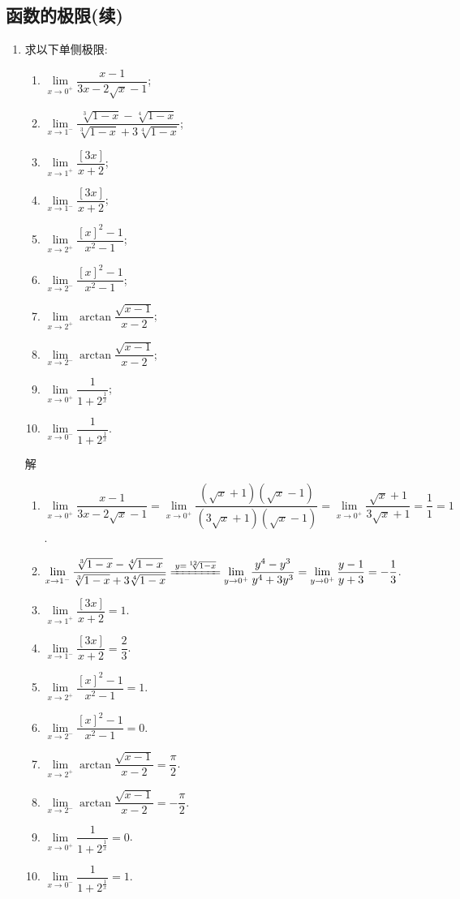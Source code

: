 \documentclass[UTF8,a4paper,20pt]{article}
\begin{document}
\subsection{函数的极限(续)}
\begin{enumerate}[1.]
\item 求以下单侧极限:
	\begin{multicols}{2}
	\begin{enumerate}[(1)]
	\item $\lim\limits_{x\to 0^+} \dfrac{x-1}{3x-2\sqrt{x}-1}$;
	\item $\lim\limits_{x\to 1^-} \dfrac{\sqrt[3]{1-x}-\sqrt[4]{1-x}}{\sqrt[3]{1-x}+3\sqrt[4]{1-x}}$;
	\item $\lim\limits_{x\to 1^+} \dfrac{[3x]}{x+2}$;
	\item $\lim\limits_{x\to 1^-} \dfrac{[3x]}{x+2}$;
	\item $\lim\limits_{x\to 2^+} \dfrac{[x]^2-1}{x^2-1}$;
	\item $\lim\limits_{x\to 2^-} \dfrac{[x]^2-1}{x^2-1}$;
	\item $\lim\limits_{x\to 2^+} \arctan \dfrac{\sqrt{x-1}}{x-2}$;
	\item $\lim\limits_{x\to 2^-} \arctan \dfrac{\sqrt{x-1}}{x-2}$;
	\item $\lim\limits_{x\to 0^+} \dfrac{1}{1+2^{\frac{1}{x}}}$;
	\item $\lim\limits_{x\to 0^-} \dfrac{1}{1+2^{\frac{1}{x}}}$.
	\end{enumerate}
	\end{multicols}
{\heiti 解}
	\begin{enumerate}[(1)]
	\item $\lim\limits_{x\to 0^+} \dfrac{x-1}{3x-2\sqrt{x}-1}=\lim\limits_{x\to 0^+} \dfrac{(\sqrt{x}+1)(\sqrt{x}-1)}{(3\sqrt{x}+1)(\sqrt{x}-1)}=\lim\limits_{x\to 0^+} \dfrac{\sqrt{x}+1}{3\sqrt{x}+1}=\dfrac{1}{1}=1$.
	\item $\lim\limits_{x\to 1^-} \dfrac{\sqrt[3]{1-x}-\sqrt[4]{1-x}}{\sqrt[3]{1-x}+3\sqrt[4]{1-x}}\xlongequal{y=\sqrt[12]{1-x}}\lim\limits_{y\to 0^+}\dfrac{y^4-y^3}{y^4+3y^3}=\lim\limits_{y\to 0^+}\dfrac{y-1}{y+3}=-\dfrac{1}{3}$. 
	\item $\lim\limits_{x\to 1^+} \dfrac{[3x]}{x+2}=1$.
	\item $\lim\limits_{x\to 1^-} \dfrac{[3x]}{x+2}=\dfrac{2}{3}$.
	\item $\lim\limits_{x\to 2^+} \dfrac{[x]^2-1}{x^2-1}=1$.
	\item $\lim\limits_{x\to 2^-} \dfrac{[x]^2-1}{x^2-1}=0$.
	\item $\lim\limits_{x\to 2^+} \arctan \dfrac{\sqrt{x-1}}{x-2}=\dfrac{\pi}{2}$.
	\item $\lim\limits_{x\to 2^-} \arctan \dfrac{\sqrt{x-1}}{x-2}=-\dfrac{\pi}{2}$.
  	\item $\lim\limits_{x\to 0^+} \dfrac{1}{1+2^{\frac{1}{x}}}=0$.
	\item $\lim\limits_{x\to 0^-} \dfrac{1}{1+2^{\frac{1}{x}}}=1$.
	\end{enumerate}



\end{enumerate}
\end{document}
